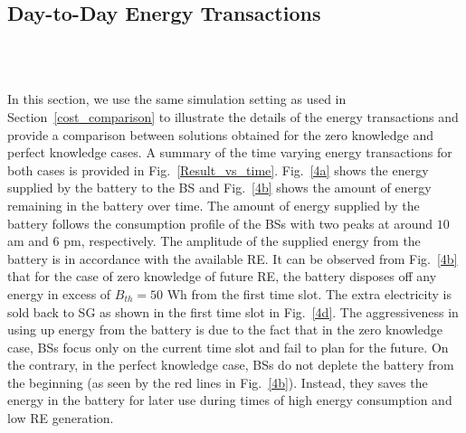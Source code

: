 \documentclass[10pt, letter,twocolumn]{IEEEtran}
\begin{document}
\subsection{Day-to-Day Energy Transactions}\vspace{-0.0cm}
\begin{figure*}[h!]
\addtolength{\subfigcapskip}{-0.0in}
\begin{center}
\\
\\
\end{center}
\vspace{-0.0in}
\caption{Day-to-day energy transactions of the BSs over time; (a) energy supplied by battery, (b) battery charge level, (c) amount of electricity procured from SG, (d) amount of extra electricity sold to SG, (e) energy bought from other BSs, (f) energy sold to other BSs, (g) energy supplied to other BSs over physical links, and (h) energy obtained from other BSs over physical links. }
\label{Result_vs_time} \vspace{-0.00in}
\end{figure*}

In this section, we use the same simulation setting as used in Section~\ref{cost_comparison} to illustrate the details of the energy transactions and provide a comparison between solutions obtained for the zero knowledge and perfect knowledge cases. A summary of the time varying energy transactions for both cases is provided in Fig.~\ref{Result_vs_time}. Fig.~\ref{4a} shows the energy supplied by the battery to the BS and Fig.~\ref{4b} shows the amount of energy remaining in the battery over time. The amount of energy supplied by the battery follows the consumption profile of the BSs with two peaks at around $10$ am and $6$ pm, respectively. The amplitude of the supplied energy from the battery is in accordance with the available RE. It can be observed from Fig.~\ref{4b} that for the case of zero knowledge of future RE, the battery disposes off any energy in excess of $B_{th} = 50$ Wh from the first time slot. The extra electricity is sold back to SG as shown in the first time slot in Fig.~\ref{4d}. The aggressiveness in using up energy from the battery is due to the fact that in the zero knowledge case, BSs focus only on the current time slot and fail to plan for the future. On the contrary, in the perfect knowledge case, BSs do not deplete the battery from the beginning (as seen by the red lines in Fig.~\ref{4b}). Instead, they saves the energy in the battery for later use during times of high energy consumption and low RE generation.
\end{document}
